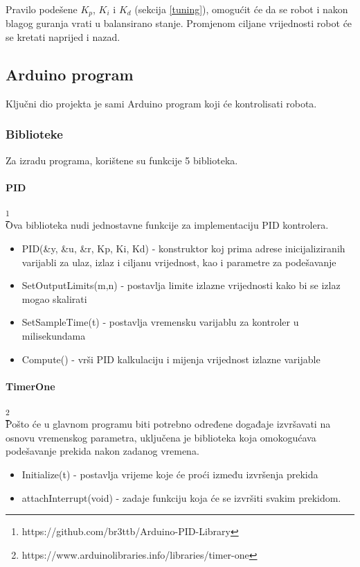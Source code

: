 \documentclass[../Document.tex]{subfiles}
\begin{document}

\noindent Pravilo podešene $K_p$, $K_i$ i $K_d$ (sekcija \ref{tuning}), omogućit će da se robot i nakon blagog guranja vrati u balansirano stanje. Promjenom ciljane vrijednosti robot će se kretati naprijed i nazad.

\subsection{Arduino program}
Ključni dio projekta je sami Arduino program koji će kontrolisati robota.

\subsubsection{Biblioteke}
Za izradu programa, korištene su funkcije 5 biblioteka.

\paragraph{PID}\footnote{https://github.com/br3ttb/Arduino-PID-Library}\mbox{}\\
\noindent Ova biblioteka nudi jednostavne funkcije za implementaciju PID kontrolera.
\begin{itemize}
    \item PID(\&y, \&u, \&r, Kp, Ki, Kd) - konstruktor koj prima adrese inicijaliziranih varijabli za ulaz, izlaz i ciljanu vrijednost, kao i parametre za podešavanje
    \item SetOutputLimits(m,n) - postavlja limite izlazne vrijednosti kako bi se izlaz mogao skalirati
    \item SetSampleTime(t) - postavlja vremensku varijablu za kontroler u milisekundama
    \item Compute() - vrši PID kalkulaciju i mijenja vrijednost izlazne varijable
\end{itemize}

\paragraph{TimerOne}\footnote{https://www.arduinolibraries.info/libraries/timer-one}\mbox{}\\
\noindent Pošto će u glavnom programu biti potrebno određene događaje izvršavati na osnovu vremenskog parametra, uključena je biblioteka koja omokogućava podešavanje prekida nakon zadanog vremena.
\begin{itemize}
    \item Initialize(t) - postavlja vrijeme koje će proći između izvršenja prekida
    \item attachInterrupt(void) - zadaje funkciju koja će se izvršiti svakim prekidom.
\end{itemize}
\end{document}
